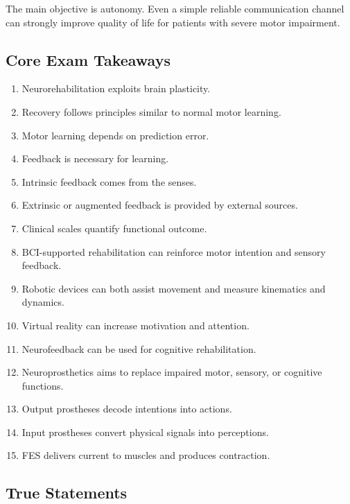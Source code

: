 \begin{authornote}
The main objective is autonomy. Even a simple reliable communication channel can strongly improve quality of life for patients with severe motor impairment.
\end{authornote}

\subsection{Core Exam Takeaways}

\begin{enumerate}
    \item Neurorehabilitation exploits brain plasticity.
    \item Recovery follows principles similar to normal motor learning.
    \item Motor learning depends on prediction error.
    \item Feedback is necessary for learning.
    \item Intrinsic feedback comes from the senses.
    \item Extrinsic or augmented feedback is provided by external sources.
    \item Clinical scales quantify functional outcome.
    \item BCI-supported rehabilitation can reinforce motor intention and sensory feedback.
    \item Robotic devices can both assist movement and measure kinematics and dynamics.
    \item Virtual reality can increase motivation and attention.
    \item Neurofeedback can be used for cognitive rehabilitation.
    \item Neuroprosthetics aims to replace impaired motor, sensory, or cognitive functions.
    \item Output prostheses decode intentions into actions.
    \item Input prostheses convert physical signals into perceptions.
    \item FES delivers current to muscles and produces contraction.
\end{enumerate}

\subsection{True Statements}


